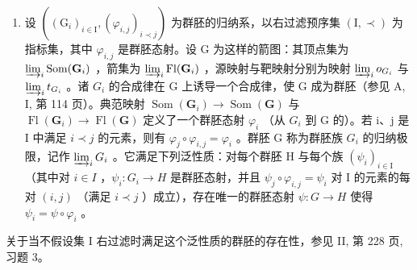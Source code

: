 \begin{enumerate}
\def\labelenumi{\arabic{enumi})}
\setcounter{enumi}{4}
\tightlist
\item
  设 \(((\mathrm{G}_{i})_{i\in\mathrm{I}},(\varphi_{i,j})_{i\prec j})\) 为群胚的归纳系，以右过滤预序集 \((\mathrm{I},\prec)\) 为指标集，其中 \(\varphi_{i,j}\) 是群胚态射。设 G 为这样的箭图：其顶点集为 \(\varinjlim_{i}\operatorname{Som}(\mathbf{G}_{i})\) ，箭集为 \(\varinjlim_{i}\operatorname{Fl}(\mathbf{G}_{i})\) ，源映射与靶映射分别为映射 \(\varinjlim_{i}o_{G_{i}}\) 与 \(\varinjlim_{i}t_{G_{i}}\) 。诸 \(G_{i}\) 的合成律在 G 上诱导一个合成律，使 G 成为群胚（参见 A, I, 第 114 页）。典范映射 \(\operatorname{Som}(\mathbf{G}_{i})\to\operatorname{Som}(\mathbf{G})\) 与 \(\operatorname{Fl}(\mathbf{G}_{i})\to\operatorname{Fl}(\mathbf{G})\) 定义了一个群胚态射 \(\varphi_{i}\) （从 \(G_{i}\) 到 G 的）。若 i、j 是 I 中满足 \(i\prec j\) 的元素，则有 \(\varphi_{j}\circ\varphi_{i,j}=\varphi_{i}\) 。群胚 G 称为群胚族 \(G_{i}\) 的归纳极限，记作 \(\varinjlim_{i}G_{i}\) 。它满足下列泛性质：对每个群胚 H 与每个族 \((\psi_{i})_{i\in\mathrm{I}}\) （其中对 \(i\in I\) ，\(\psi_{i}:G_{i}\to H\) 是群胚态射，并且 \(\psi_{j}\circ\varphi_{i,j}=\psi_{i}\) 对 I 的元素的每对 \((i,j)\) （满足 \(i\prec j\) ）成立），存在唯一的群胚态射 \(\psi:G\to H\) 使得 \(\psi_{i}=\psi\circ\varphi_{i}\) 。
\end{enumerate}

关于当不假设集 I 右过滤时满足这个泛性质的群胚的存在性，参见 II, 第 228 页, 习题 3。
